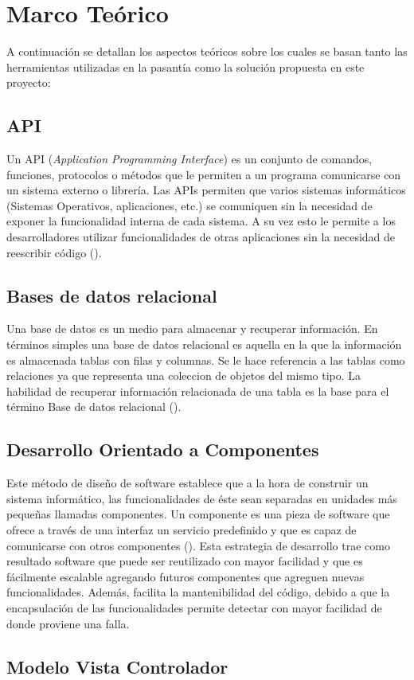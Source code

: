 \chapter{Marco Teórico}
\label{capitulo2}

A continuación se detallan los aspectos teóricos sobre los cuales se basan
tanto las herramientas utilizadas en la pasantía como la solución propuesta
en este proyecto:

\section{API}
Un API (\emph{Application Programming Interface}) es un conjunto de comandos,
funciones, protocolos o métodos que le permiten a un programa comunicarse
con un sistema externo o librería. Las APIs permiten que varios sistemas
informáticos (Sistemas Operativos, aplicaciones, etc.) se comuniquen sin la
necesidad de exponer la funcionalidad interna de cada sistema. A su vez esto
le permite a los desarrolladores utilizar funcionalidades de otras aplicaciones
sin la necesidad de reescribir código (\cite{API}).

\section{Bases de datos relacional}

Una base de datos es un medio para almacenar y recuperar información. En términos simples
una base de datos relacional es aquella en la que la información es almacenada tablas con
filas y columnas. Se le hace referencia a las tablas como relaciones ya que representa una
coleccion de objetos del mismo tipo. La habilidad de recuperar información relacionada de una
tabla es la base para el término Base de datos relacional (\cite{RELACIONAL}).

\section{Desarrollo Orientado a Componentes}

Este método de diseño de software establece que a la hora de construir un sistema
informático, las funcionalidades de éste sean separadas en unidades más pequeñas
llamadas componentes. Un componente es una pieza de software que ofrece a través
de una interfaz un servicio predefinido y que es capaz de comunicarse con otros
componentes (\cite{COMPONENT}). Esta estrategia de desarrollo trae como resultado
software que puede ser reutilizado con mayor facilidad y que es fácilmente escalable
agregando futuros componentes que agreguen nuevas funcionalidades. Además, facilita la
mantenibilidad del código, debido a que la encapsulación de las funcionalidades permite
detectar con mayor facilidad de donde proviene una falla.

\section{Modelo Vista Controlador}


